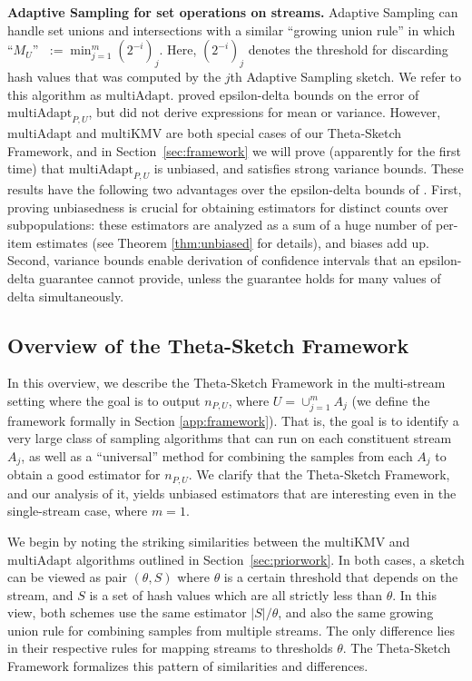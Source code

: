 \documentclass{article}
\newcommand{\edit}[1]{{#1}}
\newcommand{\romIAdapt}{\mathrm{multiAdapt}}
\newcommand{\romIKMV}{\mathrm{multiKMV}}
\begin{document}
\medskip
\noindent \textbf{Adaptive Sampling for set operations on streams.} 
Adaptive Sampling can handle set unions and intersections with a \edit{similar ``growing union rule''} in which ``$M_U$'' $\;:= \min_{j=1}^m (2^{-i})_j$. Here, $(2^{-i})_j$ denotes the threshold for discarding hash values that was computed by the $j$th Adaptive Sampling sketch.
We refer to this algorithm as $\romIAdapt$. 
\cite{gibbons2001estimating} proved epsilon-delta bounds on the error of $\romIAdapt_{P, U}$, but did not derive expressions for mean or variance. 
However, $\romIAdapt$ and $\romIKMV$ are both special cases
of our Theta-Sketch Framework, and in Section~\ref{sec:framework}
we will prove (apparently for the first time) that $\romIAdapt_{P, U}$ is unbiased, and satisfies strong variance bounds.
\edit{These results have the following two advantages over the epsilon-delta bounds of \cite{gibbons2001estimating}. 
First, proving unbiasedness is crucial for obtaining estimators for distinct counts over subpopulations: these estimators are analyzed as a sum of a huge number of per-item estimates (see Theorem \ref{thm:unbiased} for details), and biases add up. Second, variance bounds enable derivation of confidence intervals that an epsilon-delta guarantee cannot provide, unless the guarantee holds for many values of delta simultaneously.
}


\subsection{Overview of the Theta-Sketch Framework}
In this overview, we describe the Theta-Sketch Framework in the multi-stream setting where the goal is to output $n_{P, U}$, where $U=\cup_{j=1}^m A_j$ (we define the framework formally in Section \ref{app:framework}).
That is, the goal is to identify a very large class of sampling algorithms that can run on each constituent stream $A_j$,
as well as a ``universal'' method for combining the samples from each $A_j$ to obtain a good estimator for $n_{P, U}$.
We clarify that the Theta-Sketch Framework, and our analysis of it, yields unbiased estimators that are interesting even in the single-stream case, where $m=1$.

 We begin by noting the striking similarities between the $\romIKMV$ and
$\romIAdapt$ algorithms outlined in Section~\ref{sec:priorwork}. 
In both cases, a sketch can be viewed as pair $(\theta, S)$ where $\theta$ is a certain
threshold that depends on the stream, and $S$ is a set of hash values which are all strictly less than $\theta$.  
In this view, both schemes use the same estimator $|S|/\theta$, and also the same growing
union rule for combining samples from multiple streams.  The only difference lies in their respective rules for
mapping streams to thresholds $\theta$. 
The Theta-Sketch Framework
formalizes this pattern of similarities and differences.
\end{document}
